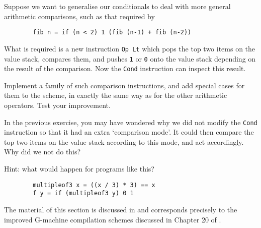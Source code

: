 \begin{exercise}
\label{ex:tim:cond2}
Suppose we want to generalise our conditionals to deal with more general
arithmetic comparisons, such as that required by
\begin{verbatim}
        fib n = if (n < 2) 1 (fib (n-1) + fib (n-2))
\end{verbatim}
What is required is a new instruction \mbox{\tt Op\ Lt} which pops the top two items on
the value stack, compares them, and pushes \mbox{\tt 1} or \mbox{\tt 0} onto the value stack
depending on the result of the comparison.
Now the \mbox{\tt Cond} instruction can inspect this result.

Implement a family of such comparison instructions, and add special cases
for them to
the \tB{} scheme, in exactly the same way as for the other
arithmetic operators.  Test your improvement.
\end{exercise}

\begin{exercise}
In the previous exercise, you may have wondered why we did not modify the
\mbox{\tt Cond} instruction so that it had an extra `comparison mode'.  It could
then compare the top two items on the value stack according to this mode,
and act accordingly.  Why did we not do this?

Hint: what would happen for programs like this?
\begin{verbatim}
        multipleof3 x = ((x / 3) * 3) == x
        f y = if (multipleof3 y) 0 1
\end{verbatim}
\end{exercise}
%
%
%
The material of this section is discussed in \cite{Argo89}
and corresponds precisely to the improved G-machine
compilation schemes discussed
in Chapter 20 of \cite{PJBook}.

